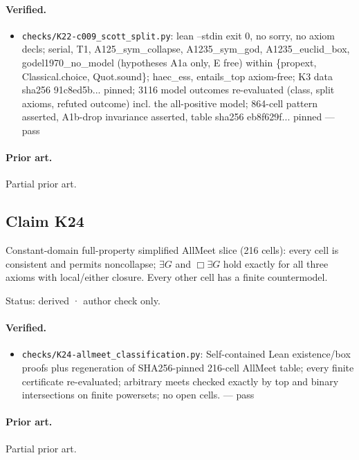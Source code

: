 \documentclass{article}
\begin{document}
\paragraph{Verified.}
\begin{itemize}
\item \texttt{checks/K22-c009\_scott\_split.py}: lean --stdin exit 0, no sorry, no axiom decls; serial, T1, A125\_sym\_collapse, A1235\_sym\_god, A1235\_euclid\_box, godel1970\_no\_model (hypotheses A1a only, E free) within \{propext, Classical.choice, Quot.sound\}; haec\_ess, entails\_top axiom-free; K3 data sha256 91c8ed5b... pinned; 3116 model outcomes re-evaluated (class, split axioms, refuted outcome) incl. the all-positive model; 864-cell pattern asserted, A1b-drop invariance asserted, table sha256 eb8f629f... pinned --- pass
\end{itemize}

\paragraph{Prior art.} Partial prior art.

\subsection*{Claim K24}

Constant-domain full-property simplified AllMeet slice (216 cells): every cell is consistent and permits noncollapse; $\exists G$ and $\Box\exists G$ hold exactly for all three axioms with local/either closure. Every other cell has a finite countermodel.

Status: derived · author check only.

\paragraph{Verified.}
\begin{itemize}
\item \texttt{checks/K24-allmeet\_classification.py}: Self-contained Lean existence/box proofs plus regeneration of SHA256-pinned 216-cell AllMeet table; every finite certificate re-evaluated; arbitrary meets checked exactly by top and binary intersections on finite powersets; no open cells. --- pass
\end{itemize}

\paragraph{Prior art.} Partial prior art.
\end{document}
